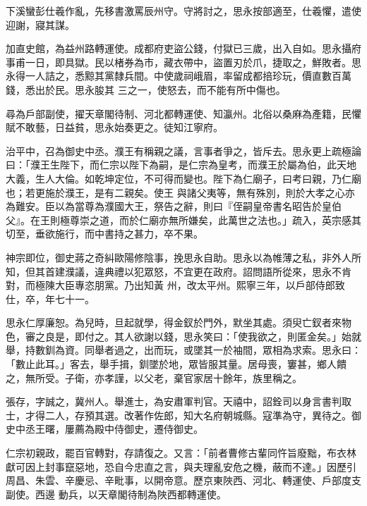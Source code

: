 \begin{pinyinscope}
 下溪蠻彭仕羲作亂，先移書激罵辰州守。守將討之，思永按部適至，仕羲懼，遣使迎謝，寢其謀。



 加直史館，為益州路轉運使。成都府吏盜公錢，付獄已三歲，出入自如。思永攝府事甫一日，即具獄。民以楮券為市，藏衣帶中，盜置刃於爪，捷取之，鮮敗者。思永得一人詰之，悉黥其黨隸兵間。中使歲祠峨眉，率留成都掊珍玩，價直數百萬錢，悉出於民。思永朘其
 三之一，使怒去，而不能有所中傷也。



 尋為戶部副使，擢天章閣待制、河北都轉運使、知瀛州。北俗以桑麻為產籍，民懼賦不敢藝，日益貧，思永始奏更之。徒知江寧府。



 治平中，召為御史中丞。濮王有稱親之議，言事者爭之，皆斥去。思永更上疏極論曰：「濮王生陛下，而仁宗以陛下為嗣，是仁宗為皇考，而濮王於屬為伯，此天地大義，生人大倫。如乾坤定位，不可得而變也。陛下為仁廟子，曰考曰親，乃仁廟也；若更施於濮王，是有二親矣。使王
 與諸父夷等，無有殊別，則於大孝之心亦為難安。臣以為當尊為濮國大王，祭告之辭，則曰『侄嗣皇帝書名昭告於皇伯父』。在王則極尊崇之道，而於仁廟亦無所嫌矣，此萬世之法也。」疏入，英宗感其切至，垂欲施行，而中書持之甚力，卒不果。



 神宗即位，御史蔣之奇糾歐陽修陰事，挽思永自助。思永以為帷薄之私，非外人所知，但其首建濮議，違典禮以犯眾怒，不宜更在政府。詔問語所從來，思永不肯對，而極陳大臣專恣朋黨。乃出知黃
 州，改太平州。熙寧三年，以戶部侍郎致仕，卒，年七十一。



 思永仁厚廉恕。為兒時，旦起就學，得金釵於門外，默坐其處。須臾亡釵者來物色，審之良是，即付之。其人欲謝以錢，思永笑曰：「使我欲之，則匿金矣。」始就舉，持數釧為資。同舉者過之，出而玩，或墜其一於袖間，眾相為求索。思永曰：「數止此耳。」客去，舉手揖，釧墜於地，眾皆服其量。居母喪，窶甚，鄉人饋之，無所受。子衛，亦孝謹，以父老，棄官家居十餘年，族里稱之。



 張存，字誠之，冀州人。舉進士，為安肅軍判官。天禧中，詔銓司以身言書判取士，才得二人，存預其選。改著作佐郎，知大名府朝城縣。寇準為守，異待之。御史中丞王曙，屢薦為殿中侍御史，遷侍御史。



 仁宗初親政，罷百官轉對，存請復之。又言：「前者曹修古輩同忤旨廢黜，布衣林獻可因上封事竄惡地，恐自今忠直之言，與夫理亂安危之機，蔽而不達。」因歷引周昌、朱雲、辛慶忌、辛毗事，以開帝意。歷京東陜西、河北、轉運使、戶部度支副使。西邊
 動兵，以天章閣待制為陜西都轉運使。




\end{pinyinscope}
